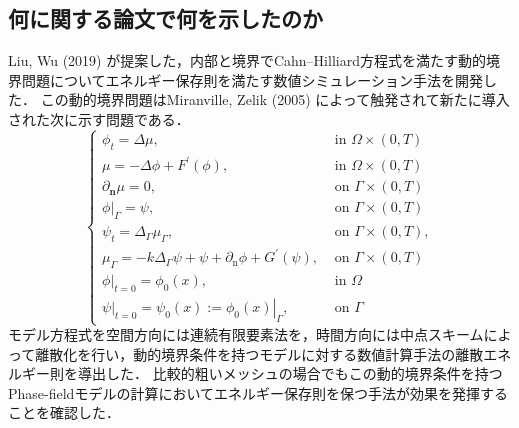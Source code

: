 \documentclass[openary, a4paper, oneside]{jsarticle}
\begin{document}
  \subsection{何に関する論文で何を示したのか}
  Liu, Wu (2019) \cite{LiuWu2019} が提案した，内部と境界でCahn--Hilliard方程式を満たす動的境界問題についてエネルギー保存則を満たす数値シミュレーション手法を開発した．
  この動的境界問題はMiranville, Zelik (2005) \cite{MiranvilleZelik2005} によって触発されて新たに導入された次に示す問題である．
  \begin{equation}
    \left\{\begin{array}{ll}
    \phi_{t}=\Delta \mu, & \text { in } \Omega \times(0, T) \\
    \mu=-\Delta \phi+F^{\prime}(\phi), & \text { in } \Omega \times(0, T) \\
    \partial_{\mathbf{n}} \mu=0, & \text { on } \Gamma \times(0, T) \\
    \left.\phi\right|_{\Gamma}=\psi, & \text { on } \Gamma \times(0, T) \\
    \psi_{t}=\Delta_{\Gamma} \mu_{\Gamma}, & \text { on } \Gamma \times(0, T), \\
    \mu_{\Gamma}=-k \Delta_{\Gamma} \psi+\psi+\partial_{\mathrm{n}} \phi+G^{\prime}(\psi), & \text { on } \Gamma \times(0, T) \\
    \left.\phi\right|_{t=0}=\phi_{0}(x), & \text { in } \Omega \\
    \left.\psi\right|_{t=0}=\psi_{0}(x):=\left.\phi_{0}(x)\right|_{\Gamma}, & \text { on } \Gamma
    \end{array}\right.
  \end{equation}
  モデル方程式を空間方向には連続有限要素法を，時間方向には中点スキームによって離散化を行い，動的境界条件を持つモデルに対する数値計算手法の離散エネルギー則を導出した．
  比較的粗いメッシュの場合でもこの動的境界条件を持つPhase-fieldモデルの計算においてエネルギー保存則を保つ手法が効果を発揮することを確認した．
\end{document}
